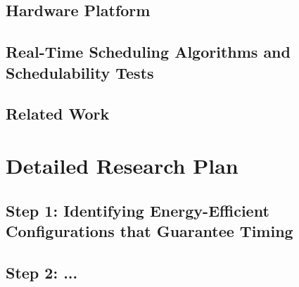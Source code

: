 \documentclass[10pt,letterpaper]{article}
\begin{document}

\subsection{Hardware Platform}
\label{sec:hardware}



\subsection{Real-Time Scheduling Algorithms and Schedulability Tests}
\label{sec:model}




\subsection{Related Work}
\label{sec:relatedwork}



\section{Detailed Research Plan}
\label{sec:researchplan}



\subsection{Step 1: Identifying Energy-Efficient Configurations that Guarantee Timing}
\label{sec:step1}



\subsection{Step 2: ...}
\label{sec:step2}


\end{document}

